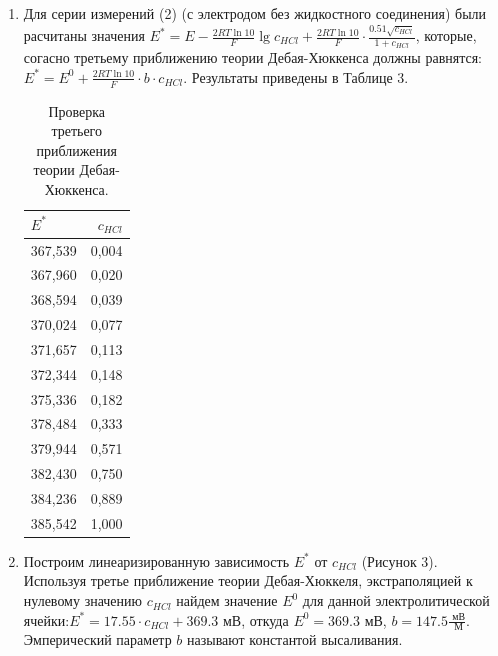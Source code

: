 \documentclass[a4paper,12pt]{article}
\begin{document}
\begin{enumerate}
\newpage
\item 
Для серии измерений (2) (с электродом без жидкостного соединения) были расчитаны значения $E^{*} = E - \frac{2RT \ln 10}{F}\lg c_{HCl} + \frac{2RT \ln 10}{F} \cdot \frac{0.51\sqrt{c_{HCl}}}{1 + c_{HCl}}$, которые, согасно третьему приближению теории Дебая-Хюккенса должны равнятся: $E^{*} = E^{0} + \frac{2RT \ln 10}{F} \cdot b \cdot c_{HCl} $. Результаты приведены в Таблице 3.

\begin{table}[h!]
\centering
\begin{tabular}{|r|r|}
\hline
\multicolumn{1}{|l|}{\textbf{$E^{*}$}} & \textbf{$c_{HCl}$} \\ \hline
367,539                                                 & 0,004               \\ \hline
367,960                                                  & 0,020                \\ \hline
368,594                                                 & 0,039               \\ \hline
370,024                                                 & 0,077               \\ \hline
371,657                                                 & 0,113               \\ \hline
372,344                                                 & 0,148               \\ \hline
375,336                                                 & 0,182               \\ \hline
378,484                                                 & 0,333               \\ \hline
379,944                                                 & 0,571               \\ \hline
382,430                                                  & 0,750                \\ \hline
384,236                                                 & 0,889               \\ \hline
385,542                                                 & 1,000                   \\ \hline
\end{tabular}
\caption{Проверка третьего приближения теории Дебая-Хюккенса.}
\label{tab:my-table}
\end{table}

\item Построим линеаризированную зависимость $E^{*}$ от $c_{HCl}$ (Рисунок 3). Используя третье приближение теории Дебая-Хюккеля, экстраполяцией к нулевому значению $c_{HCl}$ найдем значение $E^{0}$ для данной электролитической ячейки:$E^{*} = 17.55 \cdot c_{HCl}  + 369.3 \text{ мВ}$, откуда $E^{0} = 369.3 \text{ мВ}$, $b = 147.5 \frac{\text{ мВ}}{\text{ М}} $. Эмперический параметр $b$ называют константой высаливания.


\end{enumerate}
\end{document}
